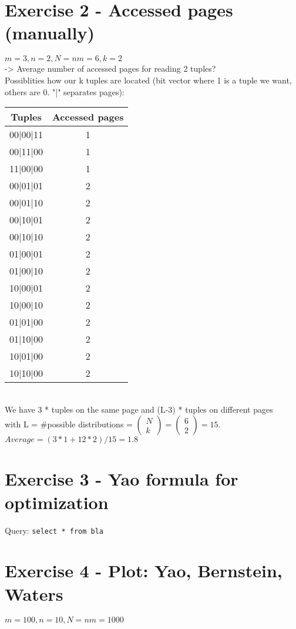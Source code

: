 \documentclass[11pt,a4paper]{scrartcl}
\begin{document}
\section*{Exercise 2 - Accessed pages (manually)}
$m = 3, n = 2, N = nm = 6, k = 2$\\
-> Average number of accessed pages for reading 2 tuples?\\
Possiblities how our k tuples are located (bit vector where 1 is a tuple we want, others are 0. "|" separates pages):\\
\begin{tabular}{|c|c|}
\hline
Tuples & Accessed pages\\
\hline
00|00|11 & 1\\
00|11|00 & 1\\
11|00|00 & 1\\
00|01|01 & 2\\
00|01|10 & 2\\
00|10|01 & 2\\
00|10|10 & 2\\
01|00|01 & 2\\
01|00|10 & 2\\
10|00|01 & 2\\
10|00|10 & 2\\
01|01|00 & 2\\
01|10|00 & 2\\
10|01|00 & 2\\
10|10|00 & 2\\
\hline
\end{tabular}\\
We have 3 * tuples on the same page and (L-3) * tuples on different pages\\
with L = \#possible distributions = $\begin{pmatrix} N \\ k \end{pmatrix} = \begin{pmatrix} 6 \\ 2 \end{pmatrix} = 15$.\\
$Average = (3*1 + 12*2)/15 = 1.8$\\

\section*{Exercise 3 - Yao formula for optimization}
Query: \verb|select * from bla|


\section*{Exercise 4 - Plot: Yao, Bernstein, Waters}
$m = 100, n = 10, N = nm = 1000$

%
\end{document}
